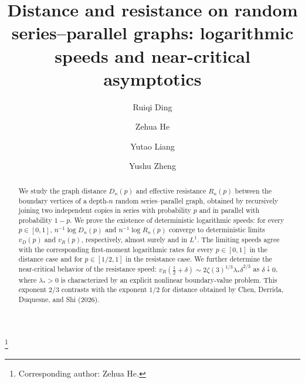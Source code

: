 \documentclass[12pt,preprint]{amsart}
\numberwithin{equation}{section}
\theoremstyle{plain}
\theoremstyle{definition}
\begin{document}
%
%
\title[Distance and resistance on random series--parallel graphs]{Distance and resistance on random series--parallel graphs:
logarithmic speeds and near-critical asymptotics}

\author[Ding et~al.]{Ruiqi Ding}
\author[]{Zehua He}
\author[]{Yutao Liang}
\author[]{Yushu Zheng}
\thanks{Corresponding author: Zehua He.}

\address[Ruiqi Ding, Zehua He, and Yutao Liang]{
State Key Laboratory of Mathematical Sciences, Academy of Mathematics and
Systems Science, Chinese Academy of Sciences, Beijing 100190, China}
\address[Ruiqi Ding, Zehua He, and Yutao Liang]{
School of Mathematical Sciences, University of Chinese Academy of Sciences,
Beijing 100049, China}
\address[Yushu Zheng]{
School of Mathematics, Shanghai University of Finance and Economics,
Shanghai 200433, China}


%
%
%
%
%
%
%
%
%
%
%
%
%
%
%
%
%
%
%
%

\begin{abstract}
We study the graph distance $D_n(p)$ and effective resistance
$R_n(p)$ between the boundary vertices of a depth-$n$ random series--parallel
graph, obtained by recursively joining two independent copies in series with
probability $p$ and in parallel with probability $1-p$. We prove the
existence of deterministic logarithmic speeds: for every $p\in[0,1]$,
$n^{-1}\log D_n(p)$ and $n^{-1}\log R_n(p)$ converge to deterministic limits
$v_D(p)$ and $v_R(p)$, respectively, almost surely and in $L^1$. The
limiting speeds agree with the corresponding first-moment logarithmic rates
for every $p\in[0,1]$ in the distance case and for $p\in[1/2,1]$ in the
resistance case.
We further determine the near-critical behavior of the resistance speed:
$v_R(\frac12+\delta)\sim
2\zeta(3)^{1/3}\lambda_*\delta^{2/3}$ as $\delta\downarrow0$, where
$\lambda_*>0$ is characterized by an explicit nonlinear boundary-value
problem. This exponent $2/3$ contrasts with the exponent $1/2$ for distance
obtained by Chen, Derrida, Duquesne, and Shi (2026).
%
\end{abstract}

%
%
%
\maketitle
{}
\end{document}

